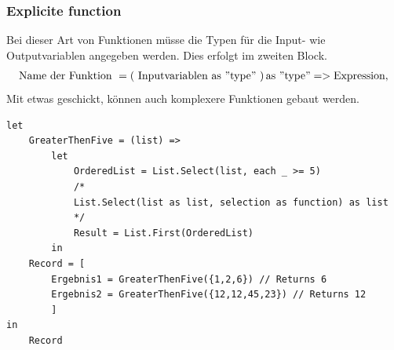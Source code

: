 \subsubsection{Explicite function}
Bei dieser Art von Funktionen müsse die Typen für die Input- wie Outputvariablen angegeben werden. Dies erfolgt im zweiten Block. 
\begin{align}
\text{Name der Funktion } = \left(\text{ Inputvariablen as $"$type$"$ }\right) \text{as $"$type$"$} = > \text{Expression}, 
\end{align} 
Mit etwas geschickt, können auch komplexere Funktionen gebaut werden.

\begin{lstlisting}[style=M]
let
	GreaterThenFive = (list) =>
		let
			OrderedList = List.Select(list, each _ >= 5) 
			/*
			List.Select(list as list, selection as function) as list
			*/
			Result = List.First(OrderedList)
		in 
	Record = [
		Ergebnis1 = GreaterThenFive({1,2,6}) // Returns 6
		Ergebnis2 = GreaterThenFive({12,12,45,23}) // Returns 12
		]
in 
	Record
\end{lstlisting} 
